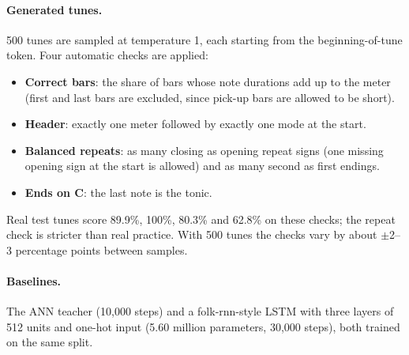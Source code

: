 \paragraph{Generated tunes.} 500 tunes are sampled at temperature 1, each starting from the beginning-of-tune token.
Four automatic checks are applied:
\begin{itemize}
  \item \textbf{Correct bars}: the share of bars whose note durations add up to the meter (first and last bars are
        excluded, since pick-up bars are allowed to be short).
  \item \textbf{Header}: exactly one meter followed by exactly one mode at the start.
  \item \textbf{Balanced repeats}: as many closing as opening repeat signs (one missing opening sign at the start
        is allowed) and as many second as first endings.
  \item \textbf{Ends on C}: the last note is the tonic.
\end{itemize}
Real test tunes score 89.9\%, 100\%, 80.3\% and 62.8\% on these checks; the repeat check is stricter than real
practice. With 500 tunes the checks vary by about $\pm$2--3 percentage points between samples.

\paragraph{Baselines.} The ANN teacher (10{,}000 steps) and a folk-rnn-style LSTM with three layers of 512 units and
one-hot input (5.60 million parameters, 30{,}000 steps), both trained on the same split.
